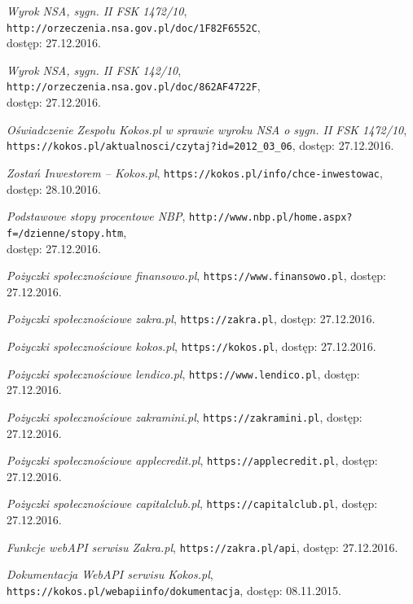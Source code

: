 \documentclass[a4paper,twoside,titlepage,openright]{book}
\begin{document}
\begin{thebibliography}{99}
 \textit{Wyrok NSA, sygn. II FSK 1472/10}, \texttt{http://orzeczenia.nsa.gov.pl/doc/1F82F6552C}, \\dostęp: 27.12.2016.

 \textit{Wyrok NSA, sygn. II FSK 142/10}, 
\texttt{http://orzeczenia.nsa.gov.pl/doc/862AF4722F}, \\dostęp: 27.12.2016.

 \textit{Oświadczenie Zespołu Kokos.pl w sprawie wyroku NSA o sygn. II FSK 1472/10}, \\
\texttt{https://kokos.pl/aktualnosci/czytaj?id=2012\_03\_06}, dostęp: 27.12.2016.

 \textit{Zostań Inwestorem -- Kokos.pl}, 
\texttt{https://kokos.pl/info/chce-inwestowac}, \\dostęp: 28.10.2016.

 \textit{Podstawowe stopy procentowe NBP}, 
\texttt{http://www.nbp.pl/home.aspx?f=/dzienne/stopy.htm}, \\dostęp: 27.12.2016.

 \textit{Pożyczki społecznościowe finansowo.pl}, 
\texttt{https://www.finansowo.pl}, dostęp: 27.12.2016.

 \textit{Pożyczki społecznościowe zakra.pl}, 
\texttt{https://zakra.pl}, dostęp: 27.12.2016.

 \textit{Pożyczki społecznościowe kokos.pl}, 
\texttt{https://kokos.pl}, dostęp: 27.12.2016.

 \textit{Pożyczki społecznościowe lendico.pl}, 
\texttt{https://www.lendico.pl}, dostęp: 27.12.2016.

 \textit{Pożyczki społecznościowe zakramini.pl}, 
\texttt{https://zakramini.pl}, dostęp: 27.12.2016.

 \textit{Pożyczki społecznościowe applecredit.pl}, 
\texttt{https://applecredit.pl}, dostęp: 27.12.2016.

 \textit{Pożyczki społecznościowe capitalclub.pl}, 
\texttt{https://capitalclub.pl}, dostęp: 27.12.2016.

 \textit{Funkcje webAPI serwisu Zakra.pl}, 
\texttt{https://zakra.pl/api}, dostęp: 27.12.2016.

 \textit{Dokumentacja WebAPI serwisu Kokos.pl}, 
\texttt{https://kokos.pl/webapiinfo/dokumentacja}, dostęp: 08.11.2015.


\end{thebibliography}
\end{document}
